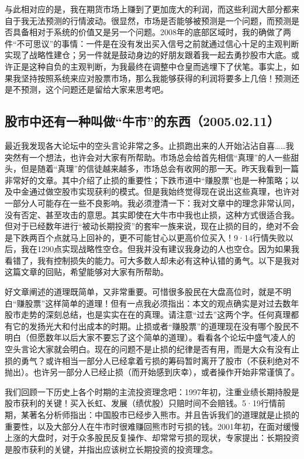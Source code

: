 与此相对应的是，我在期货市场上赚到了更加庞大的利润，而这些利润大部分都来自于我无法预测的行情波动。很显然，市场是否能够被预测是一个问题，而预测是否具备相对于系统的价值又是另一个问题。2008年的底部区域时，我的确做了两件“不可思议”的事情：一件是在没有发出买入信号之前就通过信心十足的主观判断实现了战略性建仓；另一件就是鼓动身边的好朋友跟着我一起去勇抄股市大底。或许正是这种自负的主观判断，为我最终在调整中仓皇而逃埋下了伏笔。事实上，如果我坚持按照系统来应对股票市场，那么我能够获得的利润将要多上几倍！预测还是不预测，这个问题还是留给大家来思考吧。

\subsection{股市中还有一种叫做“牛市”的东西（2005.02.11）}

最近我发现各大论坛中的空头言论非常之多。止损跑出来的人开始沾沾自喜……我突然有一个想法，也许会对大家有所帮助。市场总会给首先相信“真理”的人一些甜头，但是随着“真理”的信徒越来越多，市场总会有收网的那一天。昨天我看到一篇非常好的文章。其中介绍了止损的重要性；下跌市道中“赚股票”也是一种策略；以及中金通过做空股市实现获利的模式。但是我始终觉得现在说出这些真理，也许对一部分人可能存在一些不良影响。我必须澄清一下：我对文章中的理念非常认同，没有否定、甚至攻击的意思。其实即使在大牛市中我也止损，这种方式很适合我。但对于已经数年进行“被动长期投资”的套牢一族来说，现在止损的目的，绝对不会是下跌两百个点就马上回补的，更不可能甘心以更高价位买入！9·14行情失败以后，我在1290点实现战略性空仓。但我并没有建议我身边的人也空仓。因为如果我看错了，我有控制损失的能力。可大多数人却未必有这种认错的勇气。以下是我对这篇文章的回贴，希望能够对大家有所帮助。

好文章阐述的道理既简单，又非常重要。可惜很多股民在大盘高位时，就是不明白“赚股票”这样简单的道理！但有一点我必须指出：本文的观点确实是对过去数年股市走势的深刻总结，也是实实在在的真理。请注意“过去”这两个字。任何真理都有它的发扬光大和付出成本的时期。止损或者“赚股票”的道理现在没有哪个股民不明白（但愿数年以后大家不要忘了这个简单的道理）。看看各个论坛中盛气凌人的空头言论大家就会明白。现在的问题不是止损的纪律是否有用，而是大众有没有止损的勇气？或许相当一部分人已经拿着亏损的筹码暂时离开了股市（不获利绝对不抛出）。也许另一部分人已经止损（而开始感到庆幸），或者操作开始非常谨慎了。

我们回顾一下历史上各个时期的主流投资理念吧：1997年初，注重业绩长期持股是股市获利的关键！买入长虹、发展（绩优股）只赔时间不会赔钱。5·19行情前期，某著名分析师指出：中国股市已经步入熊市。并且告诉我们的道理就是止损的重要性，以及大部分人在牛市时很难赚回熊市时亏损的钱。2001年初，在面对缓慢上涨的大盘时，对于众多股民反复操作、却常常亏损的现状，专家提出：长期投资是股市获利的关键，并指出应该树立长期投资的投资理念。

